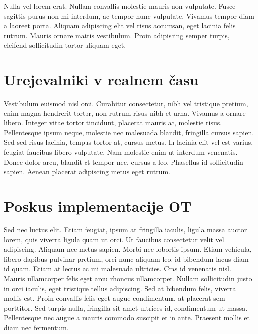\documentclass[a4paper, 12pt, twoside]{book}
\begin{document}
Nulla vel lorem erat. Nullam convallis molestie mauris non vulputate. Fusce sagittis purus non mi interdum, ac tempor nunc vulputate. Vivamus tempor diam a laoreet porta. Aliquam adipiscing elit vel risus accumsan, eget lacinia felis rutrum. Mauris ornare mattis vestibulum. Proin adipiscing semper turpis, eleifend sollicitudin tortor aliquam eget.

\chapter{Urejevalniki v realnem času}

Vestibulum euismod nisl orci. Curabitur consectetur, nibh vel tristique pretium, enim magna hendrerit tortor, non rutrum risus nibh et urna. Vivamus a ornare libero. Integer vitae tortor tincidunt, placerat mauris ac, molestie risus. Pellentesque ipsum neque, molestie nec malesuada blandit, fringilla cursus sapien. Sed sed risus lacinia, tempus tortor at, cursus metus. In lacinia elit vel est varius, feugiat faucibus libero vulputate. Nam molestie enim ut interdum venenatis. Donec dolor arcu, blandit et tempor nec, cursus a leo. Phasellus id sollicitudin sapien. Aenean placerat adipiscing metus eget rutrum.

\chapter{Poskus implementacije OT}

Sed nec luctus elit. Etiam feugiat, ipsum at fringilla iaculis, ligula massa auctor lorem, quis viverra ligula quam ut orci. Ut faucibus consectetur velit vel adipiscing. Aliquam nec metus sapien. Morbi nec lobortis ipsum. Etiam vehicula, libero dapibus pulvinar pretium, orci nunc aliquam leo, id bibendum lacus diam id quam. Etiam at lectus ac mi malesuada ultricies. Cras id venenatis nisl. Mauris ullamcorper felis eget arcu rhoncus ullamcorper. Nullam sollicitudin justo in orci iaculis, eget tristique tellus adipiscing. Sed at bibendum felis, viverra mollis est. Proin convallis felis eget augue condimentum, at placerat sem porttitor. Sed turpis nulla, fringilla sit amet ultrices id, condimentum ut massa. Pellentesque nec augue a mauris commodo suscipit et in ante. Praesent mollis et diam nec fermentum.
\end{document}
